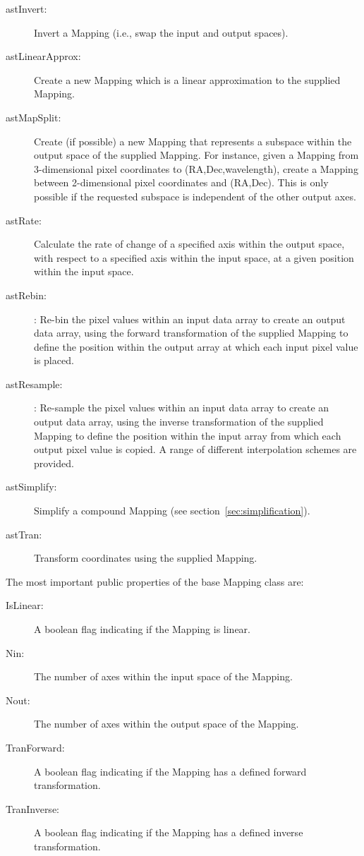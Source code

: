 \documentclass[final,authoryear,5p,times,twocolumn]{elsarticle}
\begin{document}
\begin{description}

\item[astInvert:] Invert a Mapping (i.e., swap the input and output spaces).

\item[astLinearApprox:] Create a new Mapping which is a linear approximation
to the supplied Mapping.

\item[astMapSplit:] Create (if possible) a new Mapping that represents a
subspace within the output space of the supplied Mapping. For instance,
given a Mapping from 3-dimensional pixel coordinates to
(RA,Dec,wavelength), create a Mapping between 2-dimensional pixel
coordinates and (RA,Dec). This is only possible if the requested subspace
is independent of the other output axes.

\item[astRate:] Calculate the rate of change of a specified axis within the
output space, with respect to a specified axis within the input space, at
a given position within the input space.

\item[astRebin:]: Re-bin the pixel values within an input data array to create
an output data array, using the forward transformation of the supplied Mapping
to define the position within the output array at which each input pixel value
is placed.

\item[astResample:]: Re-sample the pixel values within an input data array to
create an output data array, using the inverse transformation of the supplied
Mapping to define the position within the input array from which each
output pixel value is copied. A range of different interpolation schemes
are provided.

\item[astSimplify:] Simplify a compound Mapping (see
section~\ref{sec:simplification}).

\item[astTran:] Transform coordinates using the supplied Mapping.

\end{description}

The most important public properties of the base Mapping class are:
\begin{description}

\item[IsLinear:] A boolean flag indicating if the Mapping is linear.
\item[Nin:] The number of axes within the input space of the Mapping.
\item[Nout:] The number of axes within the output space of the Mapping.
\item[TranForward:] A boolean flag indicating if the Mapping has a defined
forward transformation.
\item[TranInverse:] A boolean flag indicating if the Mapping has a defined
inverse transformation.
\end{description}
\end{document}
